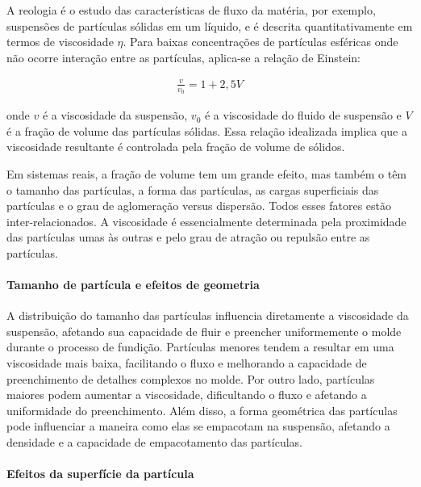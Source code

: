 \begin{definition}[Reologia]
    A reologia é o estudo das características de fluxo da matéria, por exemplo, suspensões de partículas sólidas em um líquido, e é descrita quantitativamente em termos de viscosidade $\eta$. Para baixas concentrações de partículas esféricas onde não ocorre interação entre as partículas, aplica-se a relação de Einstein:

    \begin{gather}
        \frac{v}{v_0} = 1 + 2,5V
    \end{gather}

    onde $v$ é a viscosidade da suspensão, $v_0$ é a viscosidade do fluido de suspensão e $V$ é a fração de volume das partículas sólidas. Essa relação idealizada implica que a viscosidade resultante é controlada pela fração de volume de sólidos.

\end{definition}

Em sistemas reais, a fração de volume tem um grande efeito, mas também o têm o tamanho das partículas, a forma das partículas, as cargas superficiais das partículas e o grau de aglomeração versus dispersão. Todos esses fatores estão inter-relacionados. A viscosidade é essencialmente determinada pela proximidade das partículas umas às outras e pelo grau de atração ou repulsão entre as partículas.

\paragraph*{Tamanho de partícula e efeitos de geometria}

A distribuição do tamanho das partículas influencia diretamente a viscosidade da suspensão, afetando sua capacidade de fluir e preencher uniformemente o molde durante o processo de fundição. Partículas menores tendem a resultar em uma viscosidade mais baixa, facilitando o fluxo e melhorando a capacidade de preenchimento de detalhes complexos no molde. Por outro lado, partículas maiores podem aumentar a viscosidade, dificultando o fluxo e afetando a uniformidade do preenchimento. Além disso, a forma geométrica das partículas pode influenciar a maneira como elas se empacotam na suspensão, afetando a densidade e a capacidade de empacotamento das partículas.

\paragraph*{Efeitos da superfície da partícula}

